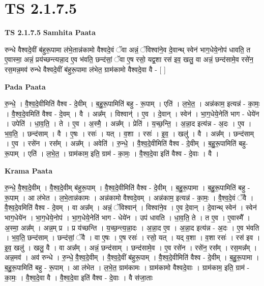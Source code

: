 \documentclass[17pt]{extarticle}
\begin{document}
\section*{ TS 2.1.7.5 }

\textbf{TS 2.1.7.5 } \newline
\textbf{Samhita Paata} \newline

रुन्धे वैश्वदे॒वीं ब॑हुरू॒पामा ल॑भे॒तान्न॑कामो वैश्वदे॒वं ॅवा अन्नं॒ ॅविश्वा॑ने॒व दे॒वान्थ् स्वेन॑ भाग॒धेये॒नोप॑ धावति॒ त ए॒वास्मा॒ अन्नं॒  प्रय॑च्छन्त्यन्ना॒द ए॒व भ॑वति॒ छन्द॑सां॒ ॅवा ए॒ष रसो॒ यद्व॒शा रस॑ इव॒ खलु॒ वा अन्नं॒ छन्द॑सामे॒व रसे॑न॒ रस॒मन्न॒मव॑ रुन्धे वैश्वदे॒वीं ब॑हुरू॒पामा ल॑भेत॒ ग्राम॑कामो वैश्वदे॒वा वै - [  ] \newline

\textbf{Pada Paata} \newline

रु॒न्धे॒ । वै॒श्व॒दे॒वीमिति॑ वैश्व - दे॒वीम् । ब॒हु॒रू॒पामिति॑ बहु - रू॒पाम् । एति॑ । ल॒भे॒त॒ । अन्न॑काम॒ इत्यन्न॑ - का॒मः॒ । वै॒श्व॒दे॒वमिति॑ वैश्व - दे॒वम् । वै । अन्न᳚म् । विश्वान्॑ । ए॒व । दे॒वान् । स्वेन॑ । भा॒ग॒धेये॒नेति॑ भाग - धेये॑न । उपेति॑ । धा॒व॒ति॒ । ते । ए॒व । अ॒स्मै॒ । अन्न᳚म् । प्रेति॑ । य॒च्छ॒न्ति॒ । अ॒न्ना॒द इत्य॑न्न - अ॒दः । ए॒व । भ॒व॒ति॒ । छन्द॑साम् । वै । ए॒षः । रसः॑ । यत् । व॒शा । रसः॑ । इ॒व॒ । खलु॑ । वै । अन्न᳚म् । छन्द॑साम् । ए॒व । रसे॑न । रस᳚म् । अन्न᳚म् । अवेति॑ । रु॒न्धे॒ । वै॒श्व॒दे॒वीमिति॑ वैश्व - दे॒वीम् । ब॒हु॒रू॒पामिति॑ बहु-रू॒पाम् । एति॑ । ल॒भे॒त॒ । ग्राम॑काम॒ इति॒ ग्राम॑ - का॒मः॒ । वै॒श्व॒दे॒वा इति॑ वैश्व - दे॒वाः । वै ।  \newline


\textbf{Krama Paata} \newline

रु॒न्धे॒ वै॒श्व॒दे॒वीम् । वै॒श्व॒दे॒वीम् ब॑हुरू॒पाम् । वै॒श्व॒दे॒वीमिति॑ वैश्व - दे॒वीम् । ब॒हु॒रू॒पामा । ब॒हु॒रू॒पामिति॑ बहु - रू॒पाम् । आ ल॑भेत । ल॒भे॒तान्न॑कामः । अन्न॑कामो वैश्वदे॒वम् । अन्न॑काम॒ इत्यन्न॑ - का॒मः॒ । वै॒श्व॒दे॒वं ॅवै । वै॒श्व॒दे॒वमिति॑ वैश्व - दे॒वम् । वा अन्न᳚म् । अन्नं॒ ॅविश्वान्॑ । विश्वा॑ने॒व । ए॒व दे॒वान् । दे॒वान्थ् स्वेन॑ । स्वेन॑ भाग॒धेये॑न । भा॒ग॒धेये॒नोप॑ । भा॒ग॒धेये॒नेति॑ भाग - धेये॑न । उप॑ धावति । धा॒व॒ति॒ ते । त ए॒व । ए॒वास्मै᳚ । अ॒स्मा॒ अन्न᳚म् । अन्न॒म् प्र । प्र य॑च्छन्ति । य॒च्छ॒न्त्य॒न्ना॒दः । अ॒न्ना॒द ए॒व । अ॒न्ना॒द इत्य॑न्न - अ॒दः । ए॒व भ॑वति । भ॒व॒ति॒ छन्द॑साम् । छन्द॑सां॒ ॅवै । वा ए॒षः । ए॒ष रसः॑ । रसो॒ यत् । यद् व॒शा । व॒शा रसः॑ । रस॑ इव । इ॒व॒ खलु॑ । खलु॒ वै । वा अन्न᳚म् । अन्नं॒ छन्द॑साम् । छन्द॑सामे॒व । ए॒व रसे॑न । रसे॑न॒ रस᳚म् । रस॒मन्न᳚म् । अन्न॒मव॑ । अव॑ रुन्धे । रु॒न्धे॒ वै॒श्व॒दे॒वीम् । वै॒श्व॒दे॒वीं ब॑हुरू॒पाम् । वै॒श्व॒दे॒वीमिति॑ वैश्व - दे॒वीम् । ब॒हु॒रू॒पामा । ब॒हु॒रू॒पामिति॑ बहु - रू॒पाम् । आ ल॑भेत । ल॒भे॒त॒ ग्राम॑कामः । ग्राम॑कामो वैश्वदे॒वाः । ग्राम॑काम॒ इति॒ ग्राम॑ - का॒मः॒ । वै॒श्व॒दे॒वा वै । वै॒श्व॒दे॒वा इति॑ वैश्व - दे॒वाः । वै स॑जा॒ताः \newline
\end{document}
